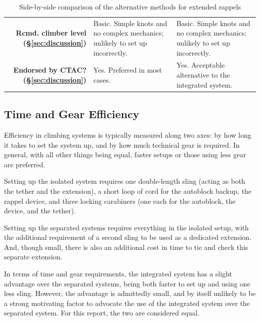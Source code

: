 \documentclass[nonacm,acmtog]{acmart}
\begin{document}
\begin{table}
\begin{tabular}{|rp{2.25in}p{2.25in}|}
         {\bf Rcmd. climber level (\S\ref{sec:discussion})} &
            Basic.  Simple knots and no complex mechanics; unlikely to set up
               incorrectly.  &
            Basic.  Simple knots and no complex mechanics; unlikely to set up
               incorrectly.
               \vspace{0.1in} \\

         {\bf Endorsed by CTAC? (\S\ref{sec:discussion})} &
            Yes. Preferred in most cases. &
            Yes. Acceptable alternative to the integrated system.
               \vspace{0.1in} \\
      \hline
   \end{tabular}
   \caption{Side-by-side comparison of the alternative methods for extended
      rappels}
   \label{tab:side-by-side}
   \end{table}

\subsection{Time and Gear Efficiency}
\label{sec:efficiency}

   Efficiency in climbing systems is typically measured along two axes: by how
   long it takes to set the system up, and by how much technical gear is
   required.  In general, with all other things being equal, faster setups or
   those using less gear are preferred.

   Setting up the isolated system requires one double-length sling (acting as
   both the tether and the extension), a short loop of cord for the autoblock
   backup, the rappel device, and three locking carabiners (one each for the
   autoblock, the device, and the tether).

   Setting up the separated systems requires everything in the isolated setup,
   with the additional requirement of a second sling to be used as a dedicated
   extension.  And, though small, there is also an additional cost in time to
   tie and check this separate extension.

   In terms of time and gear requirements, the integrated system has a slight
   advantage over the separated systems, being both faster to set up and using
   one less sling.  However, the advantage is admittedly small, and by itself
   unlikely to be a strong motivating factor to advocate the use of the
   integrated system over the separated system.  For this report, the two are
   considered equal.
\end{document}
